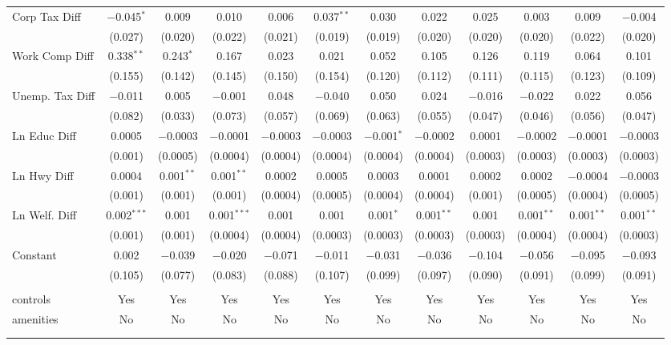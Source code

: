 \begin{table}[!htbp]
\begin{tabular}{@{\extracolsep{5pt}}lccccccccccc}
  Corp Tax Diff & $-$0.045$^{*}$ & 0.009 & 0.010 & 0.006 & 0.037$^{**}$ & 0.030 & 0.022 & 0.025 & 0.003 & 0.009 & $-$0.004 \\ 
  & (0.027) & (0.020) & (0.022) & (0.021) & (0.019) & (0.019) & (0.020) & (0.020) & (0.020) & (0.022) & (0.020) \\ 
  Work Comp Diff & 0.338$^{**}$ & 0.243$^{*}$ & 0.167 & 0.023 & 0.021 & 0.052 & 0.105 & 0.126 & 0.119 & 0.064 & 0.101 \\ 
  & (0.155) & (0.142) & (0.145) & (0.150) & (0.154) & (0.120) & (0.112) & (0.111) & (0.115) & (0.123) & (0.109) \\ 
  Unemp. Tax Diff & $-$0.011 & 0.005 & $-$0.001 & 0.048 & $-$0.040 & 0.050 & 0.024 & $-$0.016 & $-$0.022 & 0.022 & 0.056 \\ 
  & (0.082) & (0.033) & (0.073) & (0.057) & (0.069) & (0.063) & (0.055) & (0.047) & (0.046) & (0.056) & (0.047) \\ 
  Ln Educ Diff & 0.0005 & $-$0.0003 & $-$0.0001 & $-$0.0003 & $-$0.0003 & $-$0.001$^{*}$ & $-$0.0002 & 0.0001 & $-$0.0002 & $-$0.0001 & $-$0.0003 \\ 
  & (0.001) & (0.0005) & (0.0004) & (0.0004) & (0.0004) & (0.0004) & (0.0004) & (0.0003) & (0.0003) & (0.0003) & (0.0003) \\ 
  Ln Hwy Diff & 0.0004 & 0.001$^{**}$ & 0.001$^{**}$ & 0.0002 & 0.0005 & 0.0003 & 0.0001 & 0.0002 & 0.0002 & $-$0.0004 & $-$0.0003 \\ 
  & (0.001) & (0.001) & (0.001) & (0.0004) & (0.0005) & (0.0004) & (0.0004) & (0.001) & (0.0005) & (0.0004) & (0.0005) \\ 
  Ln Welf. Diff & 0.002$^{***}$ & 0.001 & 0.001$^{***}$ & 0.001 & 0.001 & 0.001$^{*}$ & 0.001$^{**}$ & 0.001 & 0.001$^{**}$ & 0.001$^{**}$ & 0.001$^{**}$ \\ 
  & (0.001) & (0.001) & (0.0004) & (0.0004) & (0.0003) & (0.0003) & (0.0003) & (0.0003) & (0.0004) & (0.0004) & (0.0003) \\ 
  Constant & 0.002 & $-$0.039 & $-$0.020 & $-$0.071 & $-$0.011 & $-$0.031 & $-$0.036 & $-$0.104 & $-$0.056 & $-$0.095 & $-$0.093 \\ 
  & (0.105) & (0.077) & (0.083) & (0.088) & (0.107) & (0.099) & (0.097) & (0.090) & (0.091) & (0.099) & (0.091) \\ 
 \hline \\[-1.8ex] 
controls & Yes & Yes & Yes & Yes & Yes & Yes & Yes & Yes & Yes & Yes & Yes \\ 
amenities & No & No & No & No & No & No & No & No & No & No & No \\ 
\hline \\[-1.8ex] 
\hline 
\hline \\[-1.8ex] 
\end{tabular} 
\end{table} 
